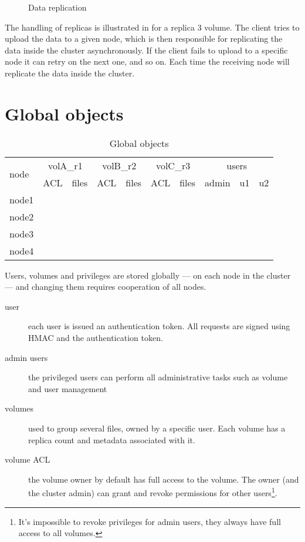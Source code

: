 \ifpdf
\begin{figure}
	\centering
	
	\caption{Data replication}
	\label{fig:replication}
\end{figure}
\fi

The handling of replicas is illustrated in  for
a replica 3 volume. The client tries to upload the data to a given node,
which is then responsible for replicating the data inside the cluster
asynchronously. If the client fails to upload to a specific node it can
retry on the next one, and so on. Each time the receiving node will
replicate the data inside the cluster.

\section{Global objects}
\newcommand{\col}[1]{#1}
\begin{table}
	\centering
	\begin{tabular}{lccccccccc}
		\hline
		\multirow{2}{*}{node} & \multicolumn{2}{c}{volA\_r1} & \multicolumn{2}{c}{volB\_r2} & \multicolumn{2}{c}{volC\_r3} & \multicolumn{3}{c}{users} \\
		& \col{ACL} & \col{files} & \col{ACL} & \col{files} & \col{ACL} & \col{files} & admin & u1 & u2 \\
		\hline
		node1 & \cmark & \cmark & \cmark & \xmark & \cmark &  \xmark  & \cmark & \cmark & \cmark \\
		node2 & \cmark & \xmark & \cmark &  \cmark & \cmark & \cmark & \cmark & \cmark & \cmark \\
		node3 & \cmark & \xmark & \cmark & \cmark & \cmark & \cmark & \cmark & \cmark & \cmark \\
		node4 & \cmark & \xmark & \cmark & \xmark & \cmark &  \cmark & \cmark & \cmark & \cmark \\ 
		\hline
	\end{tabular}
	\caption{Global objects}
	\label{tab:globals}
\end{table}

Users, volumes and privileges are stored globally --- on each node in the
cluster --- and changing them requires cooperation of all nodes.

\begin{description}
\item[user] each user is issued an authentication token. All requests are
    signed using HMAC and the authentication token.
\item[admin users] the privileged users can perform all administrative tasks
    such as volume and user management
\item[volumes] used to group several files, owned by a specific user. Each
    volume has a replica count and metadata associated with it.
\item[volume ACL] the volume owner by default has full access to the volume.
    The owner (and the cluster admin) can grant and revoke permissions for
    other users\footnote{It's impossible to revoke privileges for admin users,
    they always have full access to all volumes.}.
\end{description}

